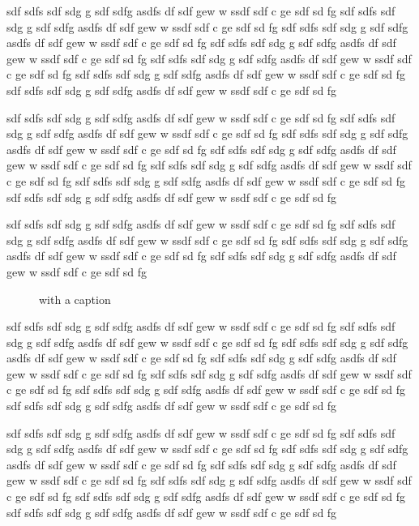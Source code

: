 \documentclass{article}
\begin{document}
sdf sdfs  sdf sdg g sdf sdfg asdfs df sdf gew w ssdf sdf c ge sdf sd fg
sdf sdfs  sdf sdg g sdf sdfg asdfs df sdf gew w ssdf sdf c ge sdf sd fg
sdf sdfs  sdf sdg g sdf sdfg asdfs df sdf gew w ssdf sdf c ge sdf sd fg
sdf sdfs  sdf sdg g sdf sdfg asdfs df sdf gew w ssdf sdf c ge sdf sd fg
sdf sdfs  sdf sdg g sdf sdfg asdfs df sdf gew w ssdf sdf c ge sdf sd fg
sdf sdfs  sdf sdg g sdf sdfg asdfs df sdf gew w ssdf sdf c ge sdf sd fg
sdf sdfs  sdf sdg g sdf sdfg asdfs df sdf gew w ssdf sdf c ge sdf sd fg

sdf sdfs  sdf sdg g sdf sdfg asdfs df sdf gew w ssdf sdf c ge sdf sd fg
sdf sdfs  sdf sdg g sdf sdfg asdfs df sdf gew w ssdf sdf c ge sdf sd fg
sdf sdfs  sdf sdg g sdf sdfg asdfs df sdf gew w ssdf sdf c ge sdf sd fg
sdf sdfs  sdf sdg g sdf sdfg asdfs df sdf gew w ssdf sdf c ge sdf sd fg
sdf sdfs  sdf sdg g sdf sdfg asdfs df sdf gew w ssdf sdf c ge sdf sd fg
sdf sdfs  sdf sdg g sdf sdfg asdfs df sdf gew w ssdf sdf c ge sdf sd fg
sdf sdfs  sdf sdg g sdf sdfg asdfs df sdf gew w ssdf sdf c ge sdf sd fg

sdf sdfs  sdf sdg g sdf sdfg asdfs df sdf gew w ssdf sdf c ge sdf sd fg
sdf sdfs  sdf sdg g sdf sdfg asdfs df sdf gew w ssdf sdf c ge sdf sd fg
sdf sdfs  sdf sdg g sdf sdfg asdfs df sdf gew w ssdf sdf c ge sdf sd fg
sdf sdfs  sdf sdg g sdf sdfg asdfs df sdf gew w ssdf sdf c ge sdf sd fg
\begin{figure}\centering
{}
\caption{with a caption}\label{fig:1}
\end{figure}
sdf sdfs  sdf sdg g sdf sdfg asdfs df sdf gew w ssdf sdf c ge sdf sd fg
sdf sdfs  sdf sdg g sdf sdfg asdfs df sdf gew w ssdf sdf c ge sdf sd fg
sdf sdfs  sdf sdg g sdf sdfg asdfs df sdf gew w ssdf sdf c ge sdf sd fg
sdf sdfs  sdf sdg g sdf sdfg asdfs df sdf gew w ssdf sdf c ge sdf sd fg
sdf sdfs  sdf sdg g sdf sdfg asdfs df sdf gew w ssdf sdf c ge sdf sd fg
sdf sdfs  sdf sdg g sdf sdfg asdfs df sdf gew w ssdf sdf c ge sdf sd fg
sdf sdfs  sdf sdg g sdf sdfg asdfs df sdf gew w ssdf sdf c ge sdf sd fg

sdf sdfs  sdf sdg g sdf sdfg asdfs df sdf gew w ssdf sdf c ge sdf sd fg
sdf sdfs  sdf sdg g sdf sdfg asdfs df sdf gew w ssdf sdf c ge sdf sd fg
sdf sdfs  sdf sdg g sdf sdfg asdfs df sdf gew w ssdf sdf c ge sdf sd fg
sdf sdfs  sdf sdg g sdf sdfg asdfs df sdf gew w ssdf sdf c ge sdf sd fg
sdf sdfs  sdf sdg g sdf sdfg asdfs df sdf gew w ssdf sdf c ge sdf sd fg
sdf sdfs  sdf sdg g sdf sdfg asdfs df sdf gew w ssdf sdf c ge sdf sd fg
sdf sdfs  sdf sdg g sdf sdfg asdfs df sdf gew w ssdf sdf c ge sdf sd fg
\end{document}
